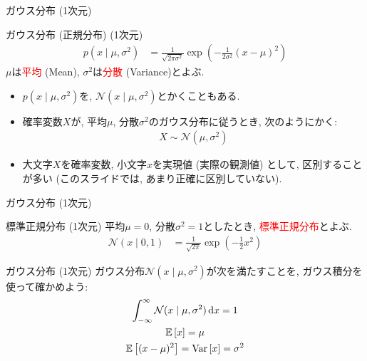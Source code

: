 \documentclass[dvipdfmx,notheorems,t]{beamer}
\begin{document}
\begin{frame}{ガウス分布 (1次元)}
\begin{block}{ガウス分布 (正規分布) (1次元)}
  \begin{align*}
    p(x \mid \mu, \sigma^2)
      &= \frac{1}{\sqrt{2 \pi \sigma^2}}
      \exp \left( -\frac{1}{2 \sigma^2} \left( x - \mu \right)^2 \right)
  \end{align*}
  $\mu$は\textcolor{red}{平均} (Mean), $\sigma^2$は\textcolor{red}{分散} (Variance)とよぶ.
\end{block}

\begin{itemize}
  \item $p(x \mid \mu, \sigma^2)$を, $\mathcal{N}(x \mid \mu, \sigma^2)$とかくこともある.
  \item 確率変数$X$が, 平均$\mu$, 分散$\sigma^2$のガウス分布に従うとき, 次のようにかく:
  \begin{align*}
    X \sim \mathcal{N}(\mu, \sigma^2)
  \end{align*}
  \item 大文字$X$を確率変数, 小文字$x$を実現値 (実際の観測値) として, 区別することが多い
  (このスライドでは, あまり正確に区別していない).
\end{itemize}
\end{frame}

\begin{frame}{ガウス分布 (1次元)}
\begin{block}{標準正規分布 (1次元)}
  平均$\mu = 0$, 分散$\sigma^2 = 1$としたとき, \textcolor{red}{標準正規分布}とよぶ.
  \begin{align*}
    \mathcal{N}(x \mid 0, 1) &= \frac{1}{\sqrt{2\pi}} \exp(-\frac{1}{2} x^2)
  \end{align*}
\end{block}
\end{frame}

\begin{frame}{ガウス分布 (1次元)}
ガウス分布$\mathcal{N}(x \mid \mu, \sigma^2)$が次を満たすことを, ガウス積分を使って確かめよう:
\begin{gather*}
  \int_{-\infty}^\infty \mathcal{N}(x \mid \mu, \sigma^2) \dd{x} = 1 \\
  \operatorname{\mathbb{E}} \left[ x \right] = \mu \\
  \operatorname{\mathbb{E}} \left[ (x - \mu)^2 \right] = \operatorname{Var} \left[ x \right] = \sigma^2
\end{gather*}
\end{frame}
\end{document}
